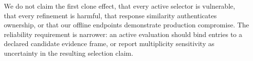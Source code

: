 We do not claim the first clone effect, that every active selector is vulnerable, that every refinement is harmful, that response similarity authenticates ownership, or that our offline endpoints demonstrate production compromise. The reliability requirement is narrower: an active evaluation should bind entries to a declared candidate evidence frame, or report multiplicity sensitivity as uncertainty in the resulting selection claim.
